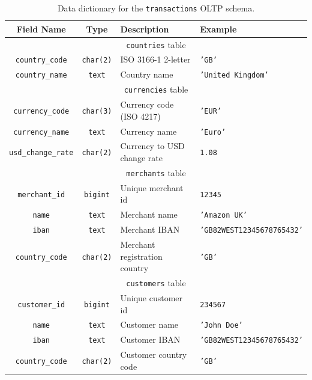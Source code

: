 \documentclass[11pt,a4paper,computermodern]{article}
\newcommand{\code}{\texttt}
\begin{document}
\begin{table}[ht]
	\centering
	\begin{threeparttable}
		\caption{Data dictionary for the \code{transactions} OLTP schema.}
		\label{table:ReferenceDataDict}
		\begin{tabularx}{0.99\textwidth}{c c >{\centering\arraybackslash}X >{\centering\arraybackslash}X}
			\toprule
			Field Name & Type & Description & Example  \\
			\midrule
			\multicolumn{4}{c}{\code{countries} table}\\
			\code{country\_code} & \code{char(2)} & ISO 3166-1 2-letter & \code{'GB'} \\
			\code{country\_name} & \code{text} & Country name & \code{'United Kingdom'} \\
			
			\midrule
			\multicolumn{4}{c}{\code{currencies} table}\\
			\code{currency\_code} & \code{char(3)} & Currency code (ISO 4217) & \code{'EUR'} \\
			\code{currency\_name} & \code{text} & Currency name & \code{'Euro'} \\
			\code{usd\_change\_rate} & \code{char(2)} & Currency to USD change rate & \code{1.08} \\
			
			\midrule
			\multicolumn{4}{c}{\code{merchants} table}\\
			\code{merchant\_id} & \code{bigint} & Unique merchant id & \code{12345} \\
			\code{name} & \code{text} & Merchant name & \code{'Amazon UK'} \\
			\code{iban} & \code{text} & Merchant IBAN & \code{'GB82WEST12345678765432'} \\
			\code{country\_code} & \code{char(2)} & Merchant registration country & \code{'GB'} \\
			
			\midrule
			\multicolumn{4}{c}{\code{customers} table}\\
			\code{customer\_id} & \code{bigint} & Unique customer id & \code{234567} \\
			\code{name} & \code{text} & Customer name & \code{'John Doe'} \\
			\code{iban} & \code{text} & Customer IBAN & \code{'GB82WEST12345678765432'} \\
			\code{country\_code} & \code{char(2)} & Customer country code  & \code{'GB'} \\
			
			\bottomrule
		\end{tabularx}
	\end{threeparttable}
\end{table}
\end{document}
